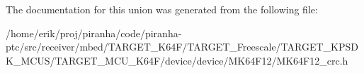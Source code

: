 The documentation for this union was generated from the following file\+:\begin{DoxyCompactItemize}
\item 
/home/erik/proj/piranha/code/piranha-\/ptc/src/receiver/mbed/\+T\+A\+R\+G\+E\+T\+\_\+\+K64\+F/\+T\+A\+R\+G\+E\+T\+\_\+\+Freescale/\+T\+A\+R\+G\+E\+T\+\_\+\+K\+P\+S\+D\+K\+\_\+\+M\+C\+U\+S/\+T\+A\+R\+G\+E\+T\+\_\+\+M\+C\+U\+\_\+\+K64\+F/device/device/\+M\+K64\+F12/M\+K64\+F12\+\_\+crc.\+h\end{DoxyCompactItemize}

